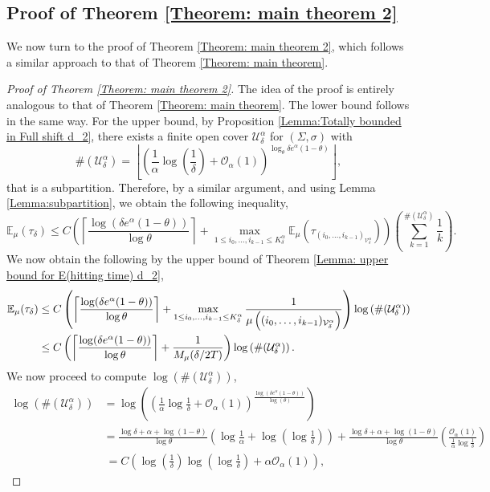 \documentclass[11pt, reqno]{amsart}
\theoremstyle{plain}%
\theoremstyle{definition}
\theoremstyle{definition}
\def\U{\ensuremath{\mathcal U}}
\def\E{\mathbb E}
\numberwithin{equation}{section}
\begin{document}
\subsection{Proof of Theorem \ref{Theorem: main theorem 2}} We now turn to the proof of Theorem \ref{Theorem: main theorem 2}, which follows a similar approach to that of Theorem \ref{Theorem: main theorem}. 

\begin{proof}[ Proof of Theorem \ref{Theorem: main theorem 2}] The idea of the proof is entirely analogous to that of Theorem \ref{Theorem: main theorem}. The lower bound follows in the same way. For the upper bound, by Proposition \ref{Lemma:Totally bounded in Full shift d_2}, there exists a finite open cover $\U_{\delta}^{\alpha}$ for $(\Sigma,\sigma)$ with $$\#(\U_{\delta}^{\alpha})= \left\lfloor\left( \frac{1}{\alpha} \log \left(\frac{1}{\delta}\right)+\mathcal{O}_\alpha(1)\right) ^ { \log_\theta{\delta e^\alpha(1-\theta)}}\right\rfloor,$$
that is a subpartition. Therefore, by a similar argument, and using Lemma \ref{Lemma:subpartition}, we obtain the following inequality,
  $$ \E_\mu(\tau_\delta)\le  C\left(\left\lceil\frac{\log(\delta e^\alpha (1-\theta))}{\log\theta}\right\rceil+\max_{1\le i_0,\ldots,i_{k-1}\le K_{\delta}^{\alpha}}\E_\mu\left(\tau_{(i_0,\ldots,i_{k-1})_{\mathcal{V}_\delta^{\alpha}}}\right)\right)\left( \sum_{k=1}^{\#({\U_{\delta}^{\alpha}})}\frac{1}{k}\right).$$
We now obtain the following by the upper bound of Theorem \ref{Lemma: upper bound for E(hitting time) d_2},
  \begin{align}\label{Inequality: upper bound for E in the proof d_2+}
   \notag\E_\mu(\tau_\delta)&\le C\left(\left\lceil\frac{\log(\delta e^\alpha (1-\theta))}{\log\theta}\right\rceil+\max_{1\le i_0,\ldots,i_{k-1}\le K_{\delta}^{\alpha}}\frac{1}{\mu\left((i_0,\ldots,i_{k-1})_{\mathcal{V}_\delta^{\alpha}}\right)}\right)\log \left(\#(\mathcal{U}_\delta^{\alpha}) \right)\\& \le C\left(\left\lceil\frac{\log(\delta e^\alpha (1-\theta))}{\log\theta}\right\rceil+\frac{1}{M_{\mu}(\delta/2T)}\right)\log \left(\#({\U_\delta^{\alpha}}) \right).
   \end{align}
We now proceed to compute $\log \left(\#(\mathcal{U}_\delta^{\alpha}) \right)$,
\begin{align*}
    \log \left(\#(\mathcal{U}_\delta^{\alpha}) \right)&=\log \left(\left(\frac{1}{\alpha}\log\frac{1}{\delta}+\mathcal{O}_\alpha(1)\right) ^ { \frac{\log(\delta e^\alpha(1-\theta))}{\log(\theta)}}\right) \\&=\frac{\log\delta+\alpha+\log(1-\theta)}{\log \theta}\left(\log\frac{1}{\alpha}+\log\left(\log\frac{1}{\delta}\right)\right)+\frac{\log\delta+\alpha+\log(1-\theta)}{\log \theta}\left(\frac{\mathcal{O}_\alpha(1)}{\frac{1}{\alpha}\log\frac{1}{\delta}}\right) \\&\ 
    =C\left(\log\left(\frac{1}{\delta}\right)\log\left(\log\frac{1}{\delta}\right)+\alpha\mathcal{O}_\alpha(1)\right),
\end{align*}


\end{proof}
\end{document}
